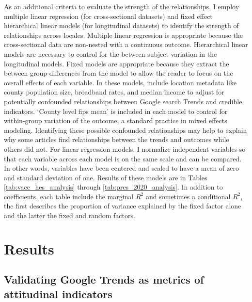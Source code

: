 As an additional criteria to evaluate the strength of the relationships, I
employ multiple linear regression (for cross-sectional datasets) and fixed
effect hierarchical linear models \citep{pinheiro_etal21} (for longitudinal
datasets) to identify the strength of relationships across locales. Multiple
linear regression is appropriate because the cross-sectional data are non-nested
with a continuous outcome. Hierarchical linear models are necessary to control
for the between-subject variation in the longitudinal models. Fixed models are
appropriate because they extract the between group-differences from the model to
allow the reader to focus on the overall effects of each variable. In these
models, include location metadata like county population size, broadband rates,
and median income to adjust for potentially confounded relationships between
Google search Trends and credible indicators. `County level fips mean' is included
in each model to control for within-group variation of the outcome, a standard practice
in mixed effects modeling. Identifying these possible
confounded relationships may help to explain why some articles find
relationships between the trends and outcomes while others did not. For linear
regression models, I normalize independent variables so that each variable
across each model is on the same scale and can be compared. In other words,
variables have been centered and scaled to have a mean of zero and standard
deviation of one. Results of these models are in Tables
\ref{tab:vacc_hes_analysis} through \ref{tab:pres_2020_analysis}. 
In addition to coefficients, each table include the marginal $R^2$ and sometimes 
a conditional $R^2$, the first describes the proportion of variance explained by the fixed factor alone and the latter the fixed and random factors. 

\section{Results}

\subsection{Validating Google Trends as metrics of attitudinal indicators}




